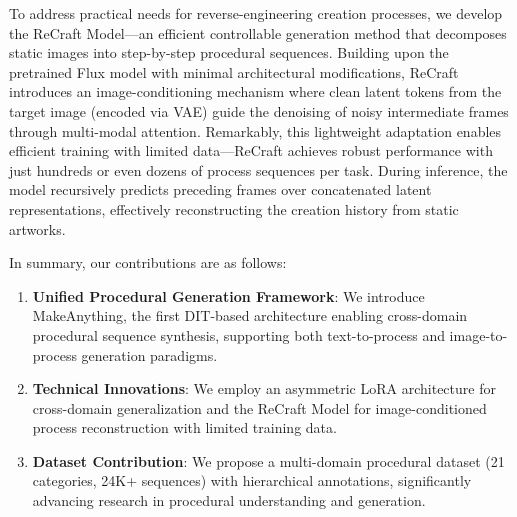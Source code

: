  To address practical needs for reverse-engineering creation processes, we develop the ReCraft Model—an efficient controllable generation method that decomposes static images into step-by-step procedural sequences. Building upon the pretrained Flux model with minimal architectural modifications, ReCraft introduces an image-conditioning mechanism where clean latent tokens from the target image (encoded via VAE) guide the denoising of noisy intermediate frames through multi-modal attention. Remarkably, this lightweight adaptation enables efficient training with limited data—ReCraft achieves robust performance with just hundreds or even dozens of process sequences per task. During inference, the model recursively predicts preceding frames over concatenated latent representations, effectively reconstructing the creation history from static artworks. 

In summary, our contributions are as follows:  
\begin{enumerate}  
\item \textbf{Unified Procedural Generation Framework}: We introduce MakeAnything, the first DIT-based architecture enabling cross-domain procedural sequence synthesis, supporting both text-to-process and image-to-process generation paradigms.
\item \textbf{Technical Innovations}: We employ an asymmetric LoRA architecture for cross-domain generalization and the ReCraft Model for image-conditioned process reconstruction with limited training data.
\item \textbf{Dataset Contribution}: We propose a multi-domain procedural dataset (21 categories, 24K+ sequences) with hierarchical annotations, significantly advancing research in procedural understanding and generation. 
\end{enumerate}  





